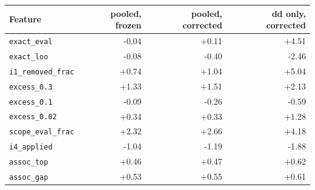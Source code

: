 \begin{tabular}{lrrr}\toprule
Feature & pooled, frozen & pooled, corrected & dd only, corrected\\\midrule
\texttt{exact\_eval} & -0.04 & +0.11 & +4.51\\
\texttt{exact\_loo} & -0.08 & -0.40 & -2.46\\
\texttt{i1\_removed\_frac} & +0.74 & +1.04 & +5.04\\
\texttt{excess\_0.3} & +1.33 & +1.51 & +2.13\\
\texttt{excess\_0.1} & -0.09 & -0.26 & -0.59\\
\texttt{excess\_0.02} & +0.34 & +0.33 & +1.28\\
\texttt{scope\_eval\_frac} & +2.32 & +2.66 & +4.18\\
\texttt{i4\_applied} & -1.04 & -1.19 & -1.88\\
\texttt{assoc\_top} & +0.46 & +0.47 & +0.62\\
\texttt{assoc\_gap} & +0.53 & +0.55 & +0.61\\
\bottomrule\end{tabular}
